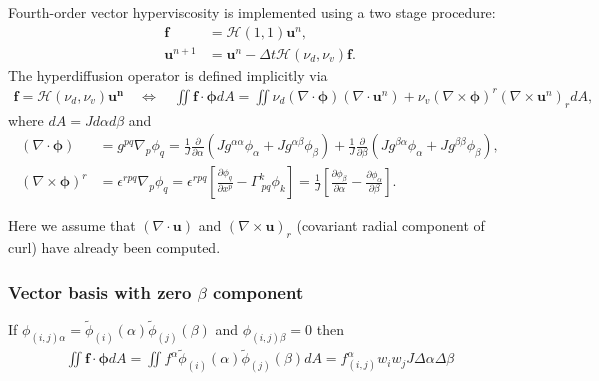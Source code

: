 \documentclass{article}
\newcommand{\vb}{\mathbf}
\newcommand{\vg}{\boldsymbol}
\newcommand{\pdiff}[2]{\frac{\partial #1}{\partial #2}}
\begin{document}
Fourth-order vector hyperviscosity is implemented using a two stage procedure:
\begin{align}
\vb{f} &= \mathcal{H}(1,1) \vb{u}^n, \\
\vb{u}^{n+1} &= \vb{u}^n - \Delta t \mathcal{H}(\nu_d, \nu_v) \vb{f}.
\end{align}  The hyperdiffusion operator is defined implicitly via
\begin{align}
\vb{f} = \mathcal{H}(\nu_d, \nu_v) \vb{u^n} \quad \Longleftrightarrow \quad \iint \vb{f} \cdot \vg{\phi} dA = \iint \nu_d (\nabla \cdot \vg{\phi}) (\nabla \cdot \vb{u}^n) + \nu_v (\nabla \times \vg{\phi})^r (\nabla \times \vb{u}^n)_r dA,
\end{align} where $dA = J d\alpha d\beta$ and
\begin{align}
(\nabla \cdot \vg{\phi}) &= g^{p q} \nabla_p \phi_q = \frac{1}{J} \pdiff{}{\alpha} \left( J g^{\alpha \alpha} \phi_\alpha + J g^{\alpha \beta} \phi_\beta \right) + \frac{1}{J} \pdiff{}{\beta} \left( J g^{\beta \alpha} \phi_\alpha + J g^{\beta \beta} \phi_\beta \right), \\
(\nabla \times \vg{\phi})^r &= \epsilon^{r p q} \nabla_p \phi_q = \epsilon^{r p q} \left[ \pdiff{\phi_q}{x^p} - \Gamma^{k}_{\ p q} \phi_k \right] = \frac{1}{J} \left[ \pdiff{\phi_\beta}{\alpha} - \pdiff{\phi_\alpha}{\beta} \right].
\end{align}

Here we assume that $(\nabla \cdot \vb{u})$ and $(\nabla \times \vb{u})_r$ (covariant radial component of curl) have already been computed.

\subsubsection{Vector basis with zero $\beta$ component}

If $\phi_{(i,j) \alpha} = \tilde{\phi}_{(i)}(\alpha) \tilde{\phi}_{(j)}(\beta)$ and $\phi_{(i,j) \beta} = 0$ then
\begin{align} \label{eq:VecHyperviscosityZeroBetaLHS}
\iint \vb{f} \cdot \vb{\phi} dA = \iint f^\alpha \tilde{\phi}_{(i)}(\alpha) \tilde{\phi}_{(j)}(\beta) dA = f^\alpha_{(i,j)} w_i w_j J \Delta \alpha \Delta \beta
\end{align}
\end{document}
